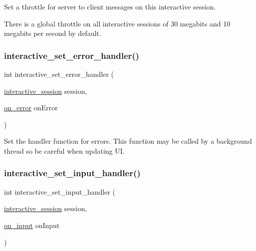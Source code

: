 Set a throttle for server to client messages on this interactive session. 

There is a global throttle on all interactive sessions of 30 megabits and 10 megabits per second by default. \mbox{\label{group___interactivity_gaf1bd8c3789d9a98969d484e68107bbc5}} 
\subsubsection{\texorpdfstring{interactive\+\_\+set\+\_\+error\+\_\+handler()}{interactive\_set\_error\_handler()}}
{\footnotesize\ttfamily int interactive\+\_\+set\+\_\+error\+\_\+handler (\begin{DoxyParamCaption}\item[{\mbox{\hyperlink{group___interactivity_ga6d8819d38b8dc8994a2299cf22a65a31}{interactive\+\_\+session}}}]{session,  }\item[{\mbox{\hyperlink{group___interactivity_gabb1eefe2ce4247a4562fe1f231a35144}{on\+\_\+error}}}]{on\+Error }\end{DoxyParamCaption})}



Set the handler function for errors. This function may be called by a background thread so be careful when updating UI. 

\mbox{\label{group___interactivity_ga401b15a543742936f4c3f2e70110a662}} 
\subsubsection{\texorpdfstring{interactive\+\_\+set\+\_\+input\+\_\+handler()}{interactive\_set\_input\_handler()}}
{\footnotesize\ttfamily int interactive\+\_\+set\+\_\+input\+\_\+handler (\begin{DoxyParamCaption}\item[{\mbox{\hyperlink{group___interactivity_ga6d8819d38b8dc8994a2299cf22a65a31}{interactive\+\_\+session}}}]{session,  }\item[{\mbox{\hyperlink{group___interactivity_gabc1d56c93e90e83489bc9200a467a9b6}{on\+\_\+input}}}]{on\+Input }\end{DoxyParamCaption})}



